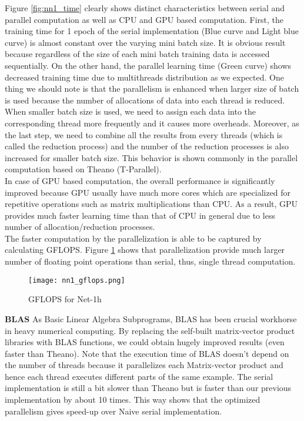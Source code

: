 Figure \ref{fig:nn1_time} clearly shows distinct characteristics between serial and parallel computation as well as CPU and GPU based computation. First, the training time for 1 epoch of the serial implementation (Blue curve and Light blue curve) is almost constant over the varying mini batch size. It is obvious result because regardless of the size of each mini batch training data is accessed sequentially. On the other hand, the parallel learning time (Green curve) shows decreased training time due to multithreads distribution as we expected. One thing we should note is that the parallelism is enhanced when larger size of batch is used because the number of allocations of data into each thread is reduced. When smaller batch size is used, we need to assign each data into the corresponding thread more frequently and it causes more overheads. Moreover, as the last step, we need to combine all the results from every threads (which is called the reduction process) and the number of the reduction processes is also increased for smaller batch size. This behavior is shown commonly in the parallel computation based on Theano (T-Parallel).\\
In case of GPU based computation, the overall performance is significantly improved because GPU usually have much more cores which are specialized for repetitive operations such as matrix multiplications than CPU. As a result, GPU provides much faster learning time than that of CPU in general due to less number of allocation/reduction processes.\\
The faster computation by the parallelization is able to be captured by calculating GFLOPS. Figure \ref{fig:nn1_gflops} shows that parallelization provide much larger number of floating point operations than serial, thus, single thread computation.
\begin{figure}[ht]
\begin{center}
\centerline{\texttt{[image: nn1\_gflops.png]}}
\caption{GFLOPS for Net-1h}
\label{fig:nn1_gflops}
\end{center}
\vskip -0.4in
\end{figure}

\textbf{BLAS} As Basic Linear Algebra Subprograms, BLAS has been crucial workhorse in heavy numerical computing. By replacing the self-built matrix-vector product libraries with BLAS functions, we could obtain hugely improved results (even faster than Theano). Note that the execution time of BLAS doesn't depend on the number of threads because it parallelizes each Matrix-vector product and hence each thread executes different parts of the same example. The serial implementation is still a bit slower than Theano but is faster than our previous implementation by about 10 times. This way shows that the optimized parallelism gives speed-up over Naive serial implementation. \\

